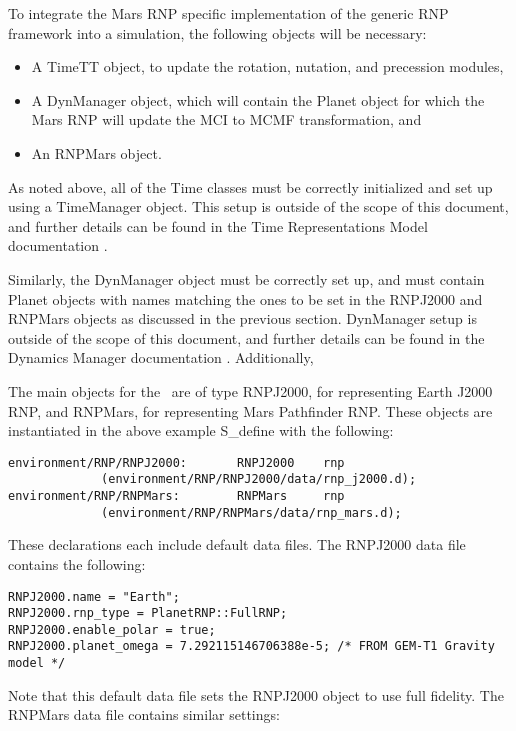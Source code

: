 To integrate the Mars RNP specific implementation of the generic RNP framework
into a simulation, the following objects will be necessary:

\begin{itemize}
\item{A TimeTT object}, to update the rotation, nutation, and precession
modules,
\item{A DynManager object}, which will contain the Planet object for which the
Mars RNP will update the MCI to MCMF transformation, and
\item{An RNPMars object}.
\end{itemize}

As noted above, all of the Time classes must be correctly initialized and
set up using a TimeManager object. This setup is outside of the scope of this
document, and further details can be found in the Time Representations Model
documentation \cite{dynenv:TIME}.

Similarly, the DynManager object must be correctly set up, and must contain
Planet objects with names matching the ones to be set in the RNPJ2000 and
RNPMars objects as discussed in the previous section. DynManager setup is
outside of the scope of this document, and further details can be found in the
Dynamics Manager documentation \cite{dynenv:DYNMANAGER}. Additionally,

The main objects for the \ModelDesc\ are of type RNPJ2000, for representing
Earth J2000 RNP, and RNPMars, for representing Mars Pathfinder RNP. These
objects are instantiated in the above example S\_define with the following:

\begin{verbatim}
environment/RNP/RNPJ2000:       RNPJ2000    rnp
             (environment/RNP/RNPJ2000/data/rnp_j2000.d);
environment/RNP/RNPMars:        RNPMars     rnp
             (environment/RNP/RNPMars/data/rnp_mars.d);
\end{verbatim}

These declarations each include default data files. The RNPJ2000 data file
contains the following:

\begin{verbatim}
RNPJ2000.name = "Earth";
RNPJ2000.rnp_type = PlanetRNP::FullRNP;
RNPJ2000.enable_polar = true;
RNPJ2000.planet_omega = 7.292115146706388e-5; /* FROM GEM-T1 Gravity model */
\end{verbatim}

Note that this default data file sets the RNPJ2000 object to use full fidelity.
The RNPMars data file contains similar settings:

